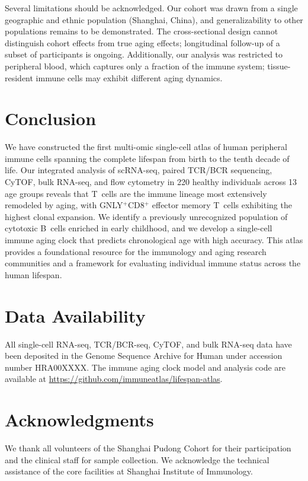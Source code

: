 \documentclass[11pt]{article}
\begin{document}
Several limitations should be acknowledged. Our cohort was drawn from a single geographic and ethnic population (Shanghai, China), and generalizability to other populations remains to be demonstrated. The cross-sectional design cannot distinguish cohort effects from true aging effects; longitudinal follow-up of a subset of participants is ongoing. Additionally, our analysis was restricted to peripheral blood, which captures only a fraction of the immune system; tissue-resident immune cells may exhibit different aging dynamics.

\section{Conclusion}

We have constructed the first multi-omic single-cell atlas of human peripheral immune cells spanning the complete lifespan from birth to the tenth decade of life. Our integrated analysis of scRNA-seq, paired TCR/BCR sequencing, CyTOF, bulk RNA-seq, and flow cytometry in 220 healthy individuals across 13 age groups reveals that T~cells are the immune lineage most extensively remodeled by aging, with GNLY$^+$CD8$^+$ effector memory T~cells exhibiting the highest clonal expansion. We identify a previously unrecognized population of cytotoxic B~cells enriched in early childhood, and we develop a single-cell immune aging clock that predicts chronological age with high accuracy. This atlas provides a foundational resource for the immunology and aging research communities and a framework for evaluating individual immune status across the human lifespan.

\section*{Data Availability}

All single-cell RNA-seq, TCR/BCR-seq, CyTOF, and bulk RNA-seq data have been deposited in the Genome Sequence Archive for Human under accession number HRA00XXXX. The immune aging clock model and analysis code are available at \url{https://github.com/immuneatlas/lifespan-atlas}.

\section*{Acknowledgments}

We thank all volunteers of the Shanghai Pudong Cohort for their participation and the clinical staff for sample collection. We acknowledge the technical assistance of the core facilities at Shanghai Institute of Immunology.


\end{document}
